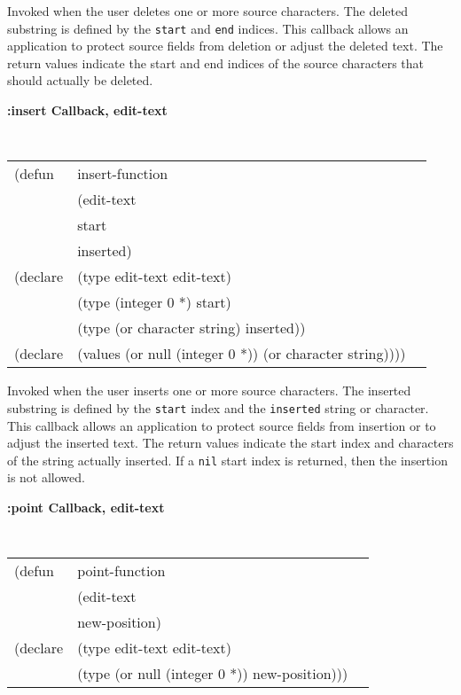 \begin{flushright} \parbox[t]{6.125in}{Invoked when the user deletes one or more
source characters.  The deleted substring is defined
by the {\tt start} and {\tt end} indices.  This callback allows an application
to protect source fields from deletion or adjust the deleted text.  The return
values indicate the start and end indices of the source characters that should
actually be deleted.

}\end{flushright}


{\samepage
{\large {\bf :insert \hfill Callback, edit-text}} 
\begin{flushright} 
\parbox[t]{6.125in}{
\tt
\begin{tabular}{lll}
\raggedright
(defun & insert-function & \\
       & (edit-text\\
       & start\\
       & inserted)\\
(declare & (type  edit-text  edit-text)\\
         & (type (integer 0 *)  start)\\
         & (type (or character string)  inserted))\\
(declare & (values (or null (integer 0 *)) (or character string))))
\end{tabular}
\rm

}\end{flushright}}

\begin{flushright} \parbox[t]{6.125in}{
Invoked when the user inserts one or more source
characters.  The inserted
substring is defined by the {\tt start} index and the {\tt inserted} string or character.  This callback
allows an application to protect source fields from insertion or to adjust the
inserted text. The return values indicate the start index and characters of the
string actually inserted. If a {\tt nil} start index is returned, then the
insertion is not allowed.

}\end{flushright}

        
{\samepage
{\large {\bf :point \hfill Callback, edit-text}} 
\begin{flushright} 
\parbox[t]{6.125in}{
\tt
\begin{tabular}{lll}
\raggedright
(defun & point-function & \\ 
& (edit-text\\
& new-position) \\
(declare & (type  edit-text  edit-text)\\
         & (type  (or null (integer 0 *))  new-position)))
\end{tabular}
\rm

}\end{flushright}}

